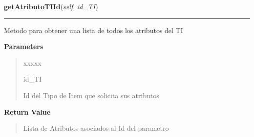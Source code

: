 \hspace{.8\funcindent}\begin{boxedminipage}{\funcwidth}

    \raggedright \textbf{getAtributoTIId}(\textit{self}, \textit{id\_TI})

    \vspace{-1.5ex}

    \rule{\textwidth}{0.5\fboxrule}
\setlength{\parskip}{2ex}
    Metodo para obtener una lista de todos los atributos del TI

\setlength{\parskip}{1ex}
      \textbf{Parameters}
      \vspace{-1ex}

      \begin{quote}
        \begin{Ventry}{xxxxx}

          \item[id\_TI]

          Id del Tipo de Item que solicita sus atributos

        \end{Ventry}

      \end{quote}

      \textbf{Return Value}
    \vspace{-1ex}

      \begin{quote}
      Lista de Atributos asociados al Id del parametro

      \end{quote}

    \end{boxedminipage}

    \label{app:controlador:contArchivo:ControllerAtributoTI:getAtributoTIIdA}

    \vspace{0.5ex}

